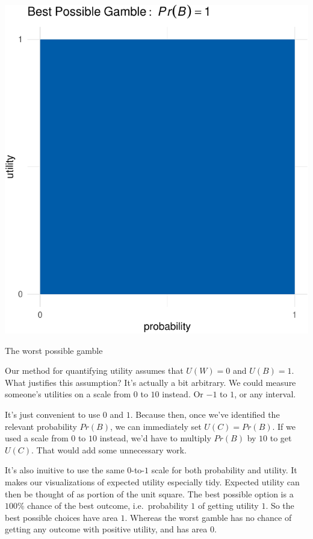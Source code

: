\documentclass[justified]{tufte-book}
\renewcommand{\u}{U}
\newcommand{\p}{Pr}
\theoremstyle{definition}
\theoremstyle{definition}
\theoremstyle{definition}
\theoremstyle{definition}
\theoremstyle{remark}
\begin{document}
\begin{marginfigure}
\includegraphics{_main_files/figure-latex/unnamed-chunk-109-1} \caption[The worst possible gamble]{The worst possible gamble}\label{fig:unnamed-chunk-109}
\end{marginfigure}

Our method for quantifying utility assumes that \(\u(W) = 0\) and \(\u(B) = 1\). What justifies this assumption? It's actually a bit arbitrary. We could measure someone's utilities on a scale from \(0\) to \(10\) instead. Or \(-1\) to \(1\), or any interval.

It's just convenient to use \(0\) and \(1\). Because then, once we've identified the relevant probability \(\p(B)\), we can immediately set \(\u(C) = \p(B)\). If we used a scale from \(0\) to \(10\) instead, we'd have to multiply \(\p(B)\) by \(10\) to get \(\u(C)\). That would add some unnecessary work.

It's also inuitive to use the same \(0\)-to-\(1\) scale for both probability and utility. It makes our visualizations of expected utility especially tidy. Expected utility can then be thought of as portion of the unit square. The best possible option is a \(100\%\) chance of the best outcome, i.e.~probability \(1\) of getting utility \(1\). So the best possible choices have area \(1\). Whereas the worst gamble has no chance of getting any outcome with positive utility, and has area \(0\).
\end{document}
